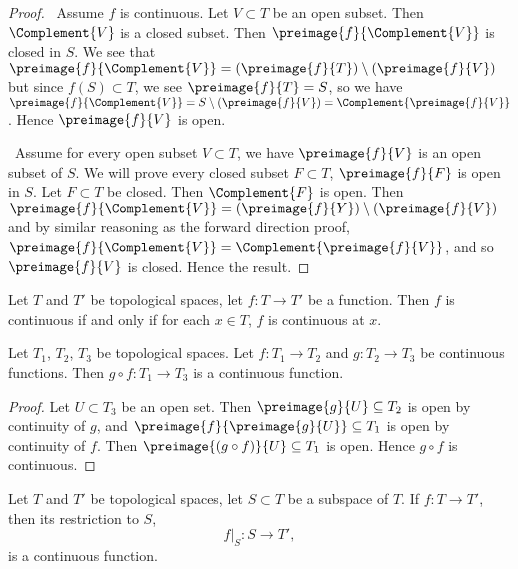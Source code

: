 \begin{proof}
\forwardproof\ Assume $f$ is continuous. Let $V\subset T$ be an open subset.
Then $\Complement{V}$ is a closed subset. Then $\preimage{f}{\Complement{V}}$
is closed in $S$. We see that
$\preimage{f}{\Complement{V}}=(\preimage{f}{T})\setminus(\preimage{f}{V})$
but since $f(S)\subset T$, we see $\preimage{f}{T}=S$, so we have
$\preimage{f}{\Complement{V}}=S\setminus(\preimage{f}{V})=\Complement{\preimage{f}{V}}$.
Hence $\preimage{f}{V}$ is open.

\backwardproof\ Assume for every open subset $V\subset T$, we have
$\preimage{f}{V}$ is an open subset of $S$. We will prove every closed
subset $F\subset T$, $\preimage{f}{F}$ is open in $S$. Let $F\subset T$
be closed. Then $\Complement{F}$ is open. Then $\preimage{f}{\Complement{V}}=(\preimage{f}{Y})\setminus(\preimage{f}{V})$
and by similar reasoning as the forward direction proof, $\preimage{f}{\Complement{V}}=\Complement{\preimage{f}{V}}$,
and so $\preimage{f}{V}$ is closed. Hence the result.
\end{proof}

\begin{theorem}
Let $T$ and $T'$ be topological spaces, let $f\colon T\to T'$ be a function.
Then $f$ is continuous if and only if for each $x\in T$, $f$ is
continuous at $x$.
\end{theorem}

\begin{theorem}\label{tops_2:46}
Let $T_{1}$, $T_{2}$, $T_{3}$ be topological spaces.
Let $f\colon T_{1}\to T_{2}$ and $g\colon T_{2}\to T_{3}$ be
continuous functions.
Then $g\circ f\colon T_{1}\to T_{3}$ is a continuous function.
\end{theorem}

\begin{proof}
Let $U\subset T_{3}$ be an open set.
Then $\preimage{g}{U}\subset T_{2}$ is open by continuity of $g$,
and $\preimage{f}{\preimage{g}{U}}\subset T_{1}$ is open by continuity
of $f$.
Then $\preimage{(g\circ f)}{U}\subset T_{1}$ is open.
Hence $g\circ f$ is continuous.
\end{proof}

\begin{theorem}
Let $T$ and $T'$ be topological spaces, let $S\subset T$ be a subspace
of $T$. If $f\colon T\to T'$, then its restriction to $S$,
$$f|_{S}\colon S\to T',$$
is a continuous function.
\end{theorem}

